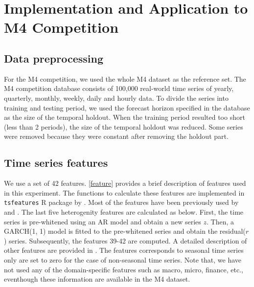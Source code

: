 \documentclass[11pt,a4paper,]{article}
\theoremstyle{definition}
\theoremstyle{definition}
\theoremstyle{definition}
\theoremstyle{remark}
\begin{document}
\section{Implementation and Application to M4
Competition}\label{implementation-and-application-to-m4-competition}

\subsection{Data preprocessing}\label{data-preprocessing}

For the M4 competition, we used the whole M4 dataset as the reference
set. The M4 competition database consists of 100,000 real-world time
series of yearly, quarterly, monthly, weekly, daily and hourly data. To
divide the series into training and testing period, we used the forecast
horizon specified in the database as the size of the temporal holdout.
When the training period resulted too short (less than 2 periods), the
size of the temporal holdout was reduced. Some series were removed
because they were constant after removing the holdout part.

\subsection{Time series features}\label{time-series-features}

We use a set of 42 features. \autoref{feature} provides a brief
description of features used in this experiment. The functions to
calculate these features are implemented in \texttt{tsfeatures} R
package by \textcite{tsfeatures}. Most of the features have been
previously used by \textcite{hyndman2015large} and \textcite{fforms}.
The last five heterogenity features are calculated as below. First, the
time series is pre-whitened using an AR model and obtain a new series
\(z\). Then, a GARCH(1, 1) model is fitted to the pre-whitened series
and obtain the residual(\(r\)) series. Subsequently, the features 39-42
are computed. A detailed description of other features are provided in
\textcite{fforms}. The features corresponds to seasonal time series only
are set to zero for the case of non-seasonal time series. Note that, we
have not used any of the domain-specific features such as macro, micro,
finance, etc., eventhough these information are available in the M4
dataset.
\end{document}
